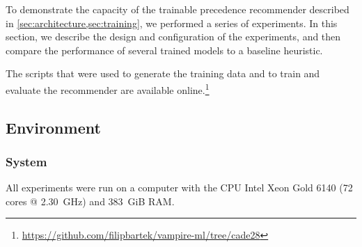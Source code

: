 


To demonstrate the capacity of the trainable precedence recommender described in \cref{sec:architecture,sec:training},
we performed a series of experiments.
In this section, we describe the design and configuration of the experiments,
and then compare the performance of several trained models to a baseline heuristic.

The scripts that were used to generate the training data and to train and evaluate the recommender
are available online.\footnote{\url{https://github.com/filipbartek/vampire-ml/tree/cade28}}

\subsection{Environment}

\subsubsection{System}

All experiments were run on a computer with
the CPU Intel Xeon Gold 6140 (72 cores @ \SI{2.30}{GHz}) and
\SI{383}{GiB} RAM.


